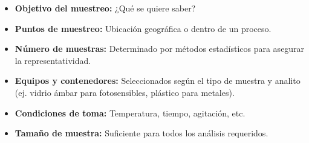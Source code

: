 \begin{itemize}
    \item \textbf{Objetivo del muestreo:} ¿Qué se quiere saber?
    \item \textbf{Puntos de muestreo:} Ubicación geográfica o dentro de un proceso.
    \item \textbf{Número de muestras:} Determinado por métodos estadísticos para asegurar la representatividad.
    \item \textbf{Equipos y contenedores:} Seleccionados según el tipo de muestra y analito (ej. vidrio ámbar para fotosensibles, plástico para metales).
    \item \textbf{Condiciones de toma:} Temperatura, tiempo, agitación, etc.
    \item \textbf{Tamaño de muestra:} Suficiente para todos los análisis requeridos.
\end{itemize}


